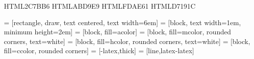 
\definecolor{hcolor} {HTML}{2C7BB6}
\definecolor{ccolor} {HTML}{ABD9E9}
\definecolor{acolor} {HTML}{FDAE61}
\definecolor{mcolor} {HTML}{D7191C}

 = [rectangle, draw, text centered, text width=6em]
 = [block, text width=1em, minimum height=2em]
 = [block, fill=acolor]
 = [block, fill=mcolor, rounded corners, text=white]
 = [block, fill=hcolor, rounded corners, text=white]
 = [block, fill=ccolor, rounded corners]
 = [-latex,thick]
 = [line,latex-latex]


